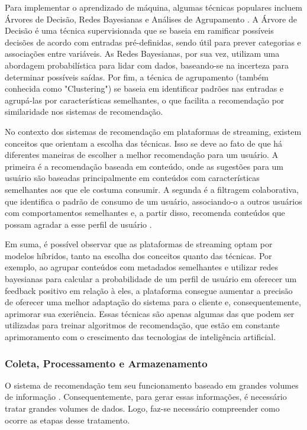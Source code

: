 \documentclass[conference]{IEEEtran}
\begin{document}
Para implementar o aprendizado de máquina, algumas técnicas populares incluem Árvores de Decisão, Redes Bayesianas e Análises de Agrupamento \cite{b7}. A Árvore de Decisão é uma técnica supervisionada que se baseia em ramificar possíveis decisões de acordo com entradas pré-definidas, sendo útil para prever categorias e associações entre variáveis. As Redes Bayesianas, por sua vez, utilizam uma abordagem probabilística para lidar com dados, baseando-se na incerteza para determinar possíveis saídas. Por fim, a técnica de agrupamento (também conhecida como "Clustering") se baseia em identificar padrões nas entradas e agrupá-las por características semelhantes, o que facilita a recomendação por similaridade nos sistemas de recomendação.

No contexto dos sistemas de recomendação em plataformas de streaming, existem conceitos que orientam a escolha das técnicas. Isso se deve ao fato de que há diferentes maneiras de escolher a melhor recomendação para um usuário. A primeira é a recomendação baseada em conteúdo, onde as sugestões para um usuário são baseadas principalmente em conteúdos com características semelhantes aos que ele costuma consumir. A segunda é a filtragem colaborativa, que identifica o padrão de consumo de um usuário, associando-o a outros usuários com comportamentos semelhantes e, a partir disso, recomenda conteúdos que possam agradar a esse perfil de usuário \cite{b6}.

Em suma, é possível observar que as plataformas de streaming optam por modelos híbridos, tanto na escolha dos conceitos quanto das técnicas. Por exemplo, ao agrupar conteúdos com metadados semelhantes e utilizar redes bayesianas para calcular a probabilidade de um perfil de usuário em oferecer um feedback positivo em relação à eles, a plataforma consegue aumentar a precisão de oferecer uma melhor adaptação do sistema para o cliente e, consequentemente, aprimorar sua exeriência. Essas técnicas são apenas algumas das que podem ser utilizadas para treinar algoritmos de recomendação, que estão em constante aprimoramento com o crescimento das tecnologias de inteligência artificial.

\subsubsection{Coleta, Processamento e Armazenamento}
\label{sec: Recomendação: Coleta, Processamento e Armazenamento}
O sistema de recomendação tem seu funcionamento baseado em grandes volumes de informação \cite{b8}. Consequentemente, para gerar essas informações, é necessário tratar grandes volumes de dados. Logo, faz-se necessário compreender como ocorre as etapas desse tratamento.
\end{document}
